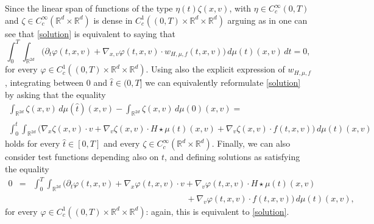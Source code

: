 \documentclass[11pt]{article}
\theoremstyle{plain}
\theoremstyle{definition}
\theoremstyle{remark}
\numberwithin{equation}{section}
\newcommand{\R}{{\mathbb R}}
\begin{document}
Since the linear span of functions of the type $\eta(t) \zeta(x,v)$, with $\eta \in C^\infty_c(0,T)$ and $\zeta \in C^\infty_c(\R^d \times \R^d)$ is dense in $C^1_c((0, T)\times \R^d \times \R^d)$ arguing as in \cite[Remark 8.1.1]{AGS} one can see that \eqref{solution} is equivalent to saying that
$$
\int_0^T\int_{\R^{2d}}\big(\partial_t \varphi (t,x,v)+\nabla_{x,v} \varphi(t,x,v)\cdot w_{H, \mu, f}(t,x,v)\big)\,d\mu(t)(x,v)\,dt=0,
$$
for every $\varphi \in C^1_c((0, T)\times \R^d \times \R^d)$.
Using also the explicit expression of $w_{H, \mu, f}$, integrating between $0$ and $\hat t \in (0, T]$ we can equivalently reformulate \eqref{solution} by asking that the equality
\begin{equation}\label{solution2}
\begin{array}{c}
\displaystyle
\int_{\R^{2d}}\zeta(x,v)\,d\mu(\hat t)(x,v)-\int_{\R^{2d}}\zeta(x,v)\,d\mu(0)(x,v)= \\[5pt]
\displaystyle
\int_0^{\hat t}\int_{\R^{2d}}\big(\nabla_x \zeta(x,v)\cdot v+\nabla_v\zeta(x,v)\cdot H\star \mu(t)(x,v)+ \nabla_v\zeta(x,v)\cdot f(t,x,v)\big)\,d\mu(t)(x,v)
\end{array}
\end{equation}
holds for every $\hat t \in [0, T]$ and every $\zeta \in C^\infty_c(\R^d \times \R^d)$. Finally, we can also consider test functions depending also on $t$, and defining solutions as satisfying the equality
\begin{eqnarray}
0&=&\!\!\int_0^T\!\!\int_{\R^{2d}}\big(\partial_t \varphi (t,x,v)+\nabla_x \varphi (t,x,v)\cdot v+\nabla_v \varphi (t,x,v)\cdot H\star \mu(t)(x,v) \\ \nonumber
&& \phantom{XXXXXXXXXXXXXXXXXXXXXx}+ \nabla_v \varphi (t,x,v)\cdot f(t,x,v)\big)\,d\mu(t)(x,v),\label{solution3}
\end{eqnarray}
for every $\varphi \in C^1_c((0, T)\times \R^d \times \R^d)$: again, this is equivalent to \eqref{solution}.
\end{document}
